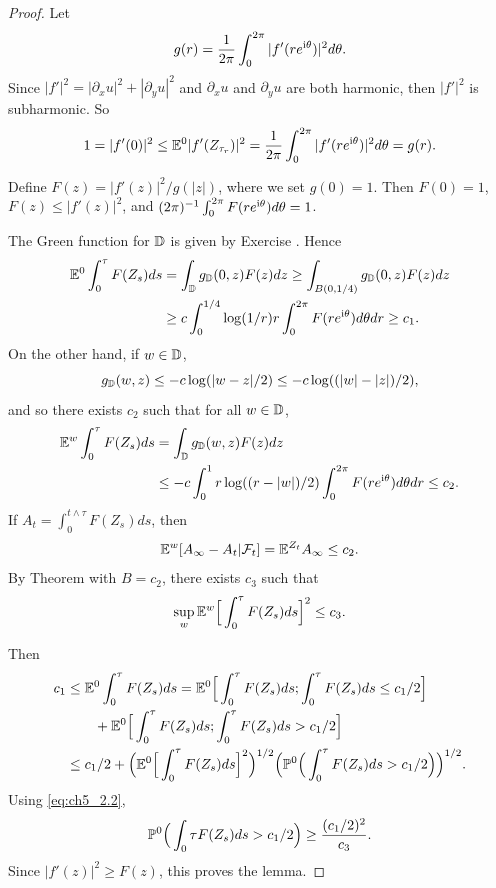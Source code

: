 \begin{proof}
Let
\[
    g(r) = \frac{1}{2\pi}\int_0^{2\pi} |f'(re^{\im\theta})|^2d\theta.
\]
Since $|f'|^2 = |\partial_xu|^2 + |\partial_yu|^2$ and $\partial_xu$ and $\partial_yu$ are both harmonic, then $|f'|^2$ is subharmonic. So
\[
    1 = |f'(0)|^2 \leq \E^0|f'(Z_{\tau_r})|^2 = \frac{1}{2\pi}\int_0^{2\pi} |f'(re^{\im\theta})|^2d\theta = g(r).
\]

Define $F(z) = |f'(z)|^2/g(|z|)$, where we set $g(0) = 1$. Then $F(0) = 1$, $F(z) \leq |f'(z)|^2$, and $(2\pi)^{-1}\int_0^{2\pi} F(re^{\im\theta})d\theta = 1$.

The Green function for $\D$ is given by Exercise . Hence
\begin{align*}
    \E^0\int_0^\tau F(Z_s)ds &= \int_{\D} g_{\D}(0,z)F(z)dz \geq \int_{B(0,1/4)} g_{\D}(0,z)F(z)dz \\
    &\geq c\int_0^{1/4} \log(1/r)r\int_0^{2\pi} F(re^{\im\theta})d\theta dr \geq c_1.
\end{align*}
On the other hand, if $w \in \D$,
\[
    g_{\D}(w,z) \leq -c\log(|w-z|/2) \leq -c\log((|w|-|z|)/2),
\]
and so there exists $c_2$ such that for all $w \in \D$,
\begin{align*}
    \E^w\int_0^\tau F(Z_s)ds &= \int_{\D} g_{\D}(w,z)F(z)dz \\
    &\leq -c\int_0^1 r\log((r-|w|)/2)\int_0^{2\pi} F(re^{\im\theta})d\theta dr \leq c_2.
\end{align*}
If $A_t = \int_0^{t\wedge \tau} F(Z_s)ds$, then
\[
    \E^w[A_\infty - A_t\mid \FC_t] = \E^{Z_t}A_\infty \leq c_2.
\]
By Theorem  with $B = c_2$, there exists $c_3$ such that
\begin{equation}\label{eq:ch5_2.2}
    \sup_w \E^w\Big[\int_0^\tau F(Z_s)ds\Big]^2 \leq c_3.
\end{equation}

Then
\begin{align*}
    c_1 &\leq \E^0\int_0^\tau F(Z_s)ds = \E^0\Big[\int_0^\tau F(Z_s)ds; \int_0^\tau F(Z_s)ds \leq c_1/2\Big] \\
    &\qquad + \E^0\Big[\int_0^\tau F(Z_s)ds; \int_0^\tau F(Z_s)ds > c_1/2\Big] \\
    &\leq c_1/2 + \Big(\E^0\Big[\int_0^\tau F(Z_s)ds\Big]^2\Big)^{1/2}\Big(\P^0\Big(\int_0^\tau F(Z_s)ds > c_1/2\Big)\Big)^{1/2}.
\end{align*}
Using \eqref{eq:ch5_2.2},
\[
    \P^0\Big(\int_0\tau F(Z_s)ds > c_1/2\Big) \geq \frac{(c_1/2)^2}{c_3}.
\]
Since $|f'(z)|^2 \geq F(z)$, this proves the lemma.
\end{proof}

